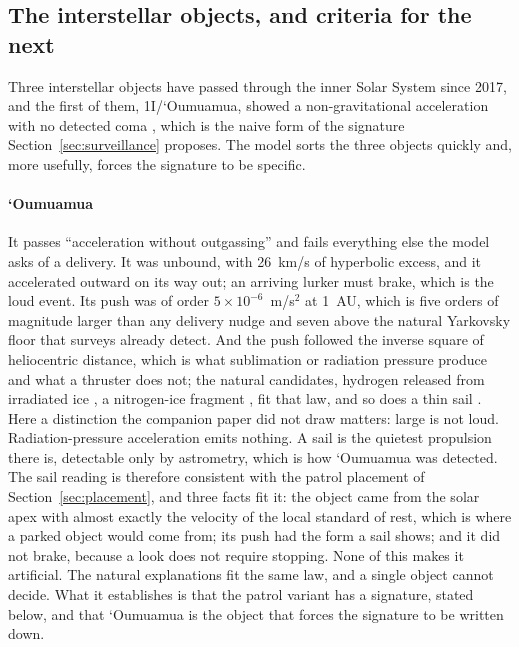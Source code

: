 \documentclass[preprint,12pt]{elsarticle}
\theoremstyle{definition}
\begin{document}
\subsection{The interstellar objects, and criteria for the next}
\label{sec:iso}

Three interstellar objects have passed through the inner Solar System since 2017, and the first of them, 1I/`Oumuamua, showed a non-gravitational acceleration with no detected coma \citep{Micheli2018}, which is the naive form of the signature Section~\ref{sec:surveillance} proposes. The model sorts the three objects quickly and, more usefully, forces the signature to be specific.

\paragraph{`Oumuamua} It passes ``acceleration without outgassing'' and fails everything else the model asks of a delivery. It was unbound, with 26~km/s of hyperbolic excess, and it accelerated outward on its way out; an arriving lurker must brake, which is the loud event. Its push was of order $5 \times 10^{-6}$~m/s$^2$ at 1~AU, which is five orders of magnitude larger than any delivery nudge and seven above the natural Yarkovsky floor that surveys already detect. And the push followed the inverse square of heliocentric distance, which is what sublimation or radiation pressure produce and what a thruster does not; the natural candidates, hydrogen released from irradiated ice \citep{BergnerSeligman2023}, a nitrogen-ice fragment \citep{DeschJackson2021}, fit that law, and so does a thin sail \citep{BialyLoeb2018}. Here a distinction the companion paper did not draw matters: large is not loud. Radiation-pressure acceleration emits nothing. A sail is the quietest propulsion there is, detectable only by astrometry, which is how `Oumuamua was detected. The sail reading is therefore consistent with the patrol placement of Section~\ref{sec:placement}, and three facts fit it: the object came from the solar apex with almost exactly the velocity of the local standard of rest, which is where a parked object would come from; its push had the form a sail shows; and it did not brake, because a look does not require stopping. None of this makes it artificial. The natural explanations fit the same law, and a single object cannot decide. What it establishes is that the patrol variant has a signature, stated below, and that `Oumuamua is the object that forces the signature to be written down.
\end{document}
